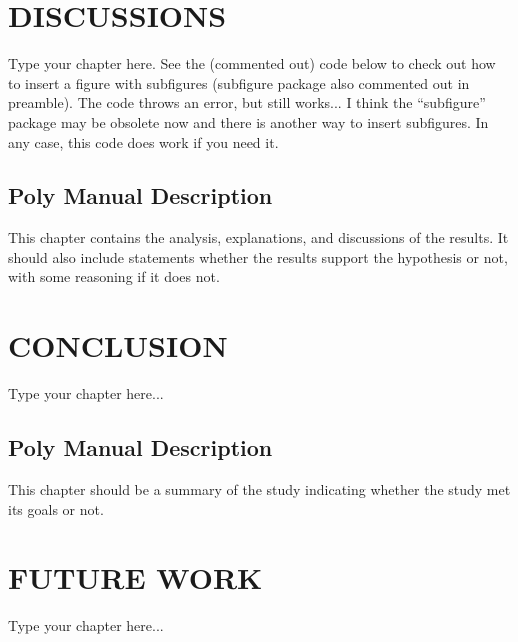 \documentclass[thesis]{fputhesis}
\begin{document}
\begin{body}
\chapter{DISCUSSIONS}
Type your chapter here. See the (commented out) code below to check out how to insert a figure with subfigures (subfigure package also commented out in preamble). The code throws an error, but still works... I think the ``subfigure'' package may be obsolete now and there is another way to insert subfigures. In any case, this code does work if you need it.






\section{Poly Manual Description}
This chapter contains the analysis, explanations, and discussions of the results. It should also include statements whether the results support the hypothesis or not, with some reasoning if it does not.







\chapter{CONCLUSION}
Type your chapter here...



\section{Poly Manual Description}
This chapter should be a summary of the study indicating whether the study met its goals or not.



\chapter{FUTURE WORK}
Type your chapter here...



\end{body}
\end{document}
